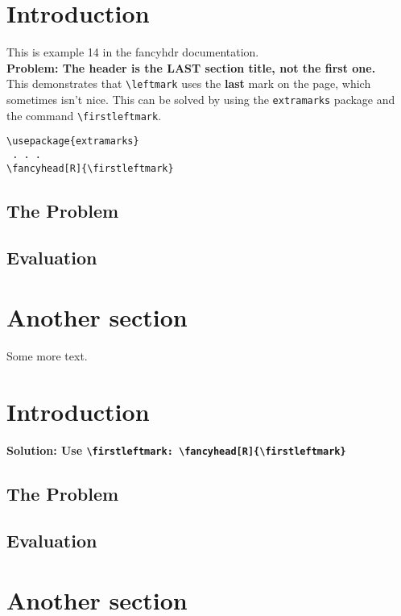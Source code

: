 \documentclass{article}
\begin{document}
\section{Introduction}

\begin{boxedminipage}{\textwidth}
This is example 14 in the fancyhdr documentation.\\
\textbf{Problem: The header  is the LAST section title, not the first one.}\\
This demonstrates that \verb|\leftmark| uses the \textbf{last} mark on the page, which sometimes isn't nice. This can be solved by using the \texttt{extramarks} package and the command \verb|\firstleftmark|.
\begin{verbatim}
\usepackage{extramarks}
 . . .
\fancyhead[R]{\firstleftmark}
\end{verbatim}
\end{boxedminipage}

\subsection{The Problem}
\label{sec:problem}

\lipsum[1]

\subsection{Evaluation}

\lipsum[2]

\section{Another section}

Some more text.

\newpage
\fancyhead[R]{\firstleftmark}

\section{Introduction}

{\bfseries Solution: Use \verb+\firstleftmark+\verb+: \fancyhead[R]{\firstleftmark}+}

\subsection{The Problem}

\lipsum[1]

\subsection{Evaluation}

\lipsum[2]

\section{Another section}

\lipsum[3-5]
\end{document}
